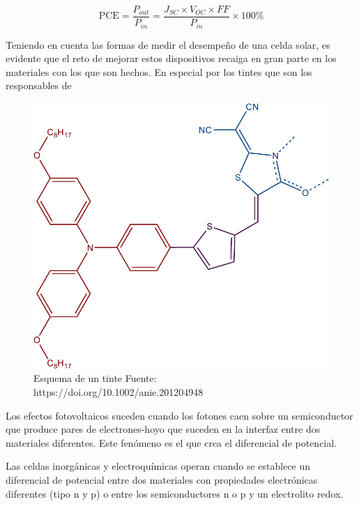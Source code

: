 \begin{equation}
    \text{PCE} = \frac{P_{out}}{P_{in}}  =\frac{J_{SC}\times V_{OC} \times FF}{P_{in}} \times 100\%
    \label{eqn:pce}
\end{equation}

Teniendo en cuenta las formas de medir el desempeño de una celda solar, es evidente que el reto de mejorar estos dispositivos recaiga en gran parte en los materiales con los que son hechos. En especial por los tintes que son los responsables de 

\begin{figure}[h!]
    \begin{center}
        \includegraphics[scale=0.5]{img/dye_scheme.pdf}
    \end{center}
    \caption{Esquema de un tinte Fuente: https://doi.org/10.1002/anie.201204948}
    \label{img:tinte}
\end{figure}


Los efectos fotovoltaicos suceden cuando los fotones caen sobre un semiconductor que produce pares de electrones-hoyo que suceden en la interfaz entre dos materiales diferentes. Este fenómeno es el que crea el diferencial de potencial.

Las celdas inorgánicas y electroquímicas operan cuando se establece un diferencial de potencial entre dos materiales con propiedades electrónicas diferentes (tipo n y p) o entre los semiconductores n o p y un electrolito redox. 



